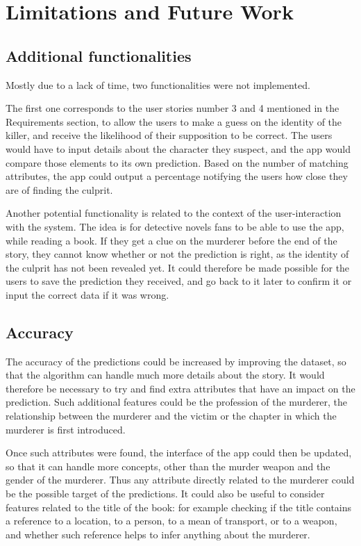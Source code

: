 \documentclass{mproj}
\begin{document}
\section{Limitations and Future Work}

\subsection{Additional functionalities}

\hspace{5mm} Mostly due to a lack of time, two functionalities were not implemented.\par

The first one corresponds to the user stories number 3 and 4 mentioned in the Requirements section, to allow the users to make a guess on the identity of the killer, and receive the likelihood of their supposition to be correct. The users would have to input details about the character they suspect, and the app would compare those elements to its own prediction. Based on the number of matching attributes, the app could output a percentage notifying the users how close they are of finding the culprit. \par

Another potential functionality is related to the context of the user-interaction with the system. The idea is for detective novels fans to be able to use the app, while reading a book. If they get a clue on the murderer before the end of the story, they cannot know whether or not the prediction is right, as the identity of the culprit has not been revealed yet. It could therefore be made possible for the users to save the prediction they received, and go back to it later to confirm it or input the correct data if it was wrong.

\subsection{Accuracy}

The accuracy of the predictions could be increased by improving the dataset, so that the algorithm can handle much more details about the story. It would therefore be necessary to try and find extra attributes that have an impact on the prediction. Such additional features could be the profession of the murderer, the relationship between the murderer and the victim or the chapter in which the murderer is first introduced. \par

Once such attributes were found, the interface of the app could then be updated, so that it can handle more concepts, other than the murder weapon and the gender of the murderer. Thus any attribute directly related to the murderer could be the possible target of the predictions.
It could also be useful to consider features related to the title of the book: for example checking if the title contains a reference to a location, to a person, to a mean of transport, or to a weapon, and whether such reference helps to infer anything about the murderer.
	
\end{document}
